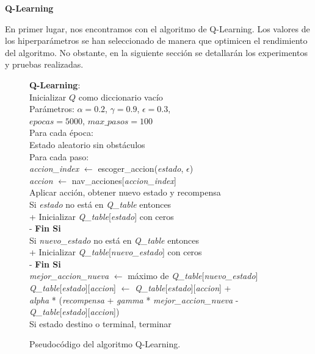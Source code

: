 \documentclass[conference,a4paper]{IEEEtran}
\begin{document}
\textbf{Q-Learning\newline}

En primer lugar, nos encontramos con el algoritmo de Q-Learning. Los valores de los hiperparámetros se han seleccionado de manera que optimicen el rendimiento del algoritmo. 
No obstante, en la siguiente sección se detallarán los experimentos y pruebas realizadas.\newline\newline\newline

\begin{figure}[h]
  \begin{pseudo}
    \textbf{Q-Learning}: \\
    Inicializar $Q$ como diccionario vacío \\
    Parámetros: $\alpha = 0.2$, $\gamma = 0.9$, $\epsilon = 0.3$, \\ $epocas = 5000$, $max\_pasos = 100$ \\
    Para cada época: \\
    \> Estado aleatorio sin obstáculos \\
    \> Para cada paso: \\
    \> \textit{accion\_index} $\leftarrow$ escoger\_accion(\textit{estado}, $\epsilon$) \\
    \> \textit{accion} $\leftarrow$ nav\_acciones[\textit{accion\_index}] \\
    \> Aplicar acción, obtener nuevo estado y recompensa \\
    Si \textit{estado} \textnormal{no está en} \textit{Q\_table} entonces \\+
      Inicializar \textit{Q\_table}[\textit{estado}] con ceros \\-
    \textbf{Fin Si} \\
    Si \textit{nuevo\_estado} \textnormal{no está en} \textit{Q\_table} entonces \\+
      Inicializar \textit{Q\_table}[\textit{nuevo\_estado}] con ceros \\-
    \textbf{Fin Si} \\
    \textit{mejor\_accion\_nueva} $\leftarrow$ máximo de \textit{Q\_table}[\textit{nuevo\_estado}] \\
    \textit{Q\_table}[\textit{estado}][\textit{accion}] $\leftarrow$ \textit{Q\_table}[\textit{estado}][\textit{accion}] + \\
    \> \textit{alpha} * (\textit{recompensa} + \textit{gamma} * \textit{mejor\_accion\_nueva} - \\
    \> \textit{Q\_table}[\textit{estado}][\textit{accion}])\\
    \> Si estado destino o terminal, terminar \\
  \end{pseudo}
  \caption{Pseudocódigo del algoritmo Q-Learning.}
  \label{fig:q-learning}
\end{figure}
\end{document}
